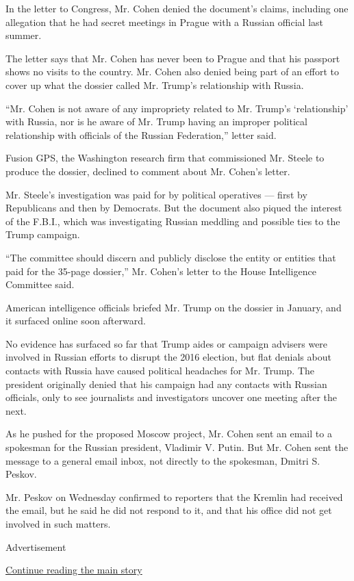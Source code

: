 In the letter to Congress, Mr. Cohen denied the document's claims,
including one allegation that he had secret meetings in Prague with a
Russian official last summer.

The letter says that Mr. Cohen has never been to Prague and that his
passport shows no visits to the country. Mr. Cohen also denied being
part of an effort to cover up what the dossier called Mr. Trump's
relationship with Russia.

``Mr. Cohen is not aware of any impropriety related to Mr. Trump's
`relationship' with Russia, nor is he aware of Mr. Trump having an
improper political relationship with officials of the Russian
Federation,'' letter said.

Fusion GPS, the Washington research firm that commissioned Mr. Steele to
produce the dossier, declined to comment about Mr. Cohen's letter.

Mr. Steele's investigation was paid for by political operatives ---
first by Republicans and then by Democrats. But the document also piqued
the interest of the F.B.I., which was investigating Russian meddling and
possible ties to the Trump campaign.

``The committee should discern and publicly disclose the entity or
entities that paid for the 35-page dossier,'' Mr. Cohen's letter to the
House Intelligence Committee said.

American intelligence officials briefed Mr. Trump on the dossier in
January, and it surfaced online soon afterward.

No evidence has surfaced so far that Trump aides or campaign advisers
were involved in Russian efforts to disrupt the 2016 election, but flat
denials about contacts with Russia have caused political headaches for
Mr. Trump. The president originally denied that his campaign had any
contacts with Russian officials, only to see journalists and
investigators uncover one meeting after the next.

As he pushed for the proposed Moscow project, Mr. Cohen sent an email to
a spokesman for the Russian president, Vladimir V. Putin. But Mr. Cohen
sent the message to a general email inbox, not directly to the
spokesman, Dmitri S. Peskov.

Mr. Peskov on Wednesday confirmed to reporters that the Kremlin had
received the email, but he said he did not respond to it, and that his
office did not get involved in such matters.

Advertisement

\protect\hyperlink{after-bottom}{Continue reading the main story}

